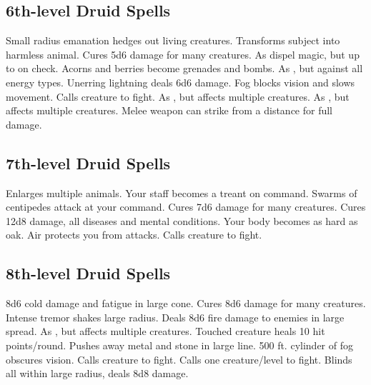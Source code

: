 \subsection{6th-level Druid Spells}
\begin{spelllist}
   Small radius emanation hedges out living creatures.
   Transforms subject into harmless animal.
   Cures 5d6 damage for many creatures.
   As dispel magic, but up to  on check.
   Acorns and berries become grenades and bombs.
   As , but against all energy types.
   Unerring lightning deals 6d6 damage.
   Fog blocks vision and slows movement.
   Calls creature to fight.
   As , but affects multiple creatures.
   As , but affects multiple creatures.
   Melee weapon can strike from a distance for full damage.
\end{spelllist}

\subsection{7th-level Druid Spells}
\begin{spelllist}
   Enlarges multiple animals.
   Your staff becomes a treant on command.
   Swarms of centipedes attack at your command.
   Cures 7d6 damage for many creatures.
   Cures 12d8 damage, all diseases and mental conditions.
   Your body becomes as hard as oak. 
   Air protects you from attacks. 
   Calls creature to fight.
\end{spelllist}

\subsection{8th-level Druid Spells}
\begin{spelllist}
   8d6 cold damage and fatigue in large cone.
   Cures 8d6 damage for many creatures.
   Intense tremor shakes large radius.
   Deals 8d6 fire damage to enemies in large spread.
   As , but affects multiple creatures.
   Touched creature heals 10 hit points/round.
   Pushes away metal and stone in large line.
   500 ft. cylinder of fog obscures vision.
   Calls creature to fight.
   Calls one creature/level to fight.
   Blinds all within large radius, deals 8d8 damage.
\end{spelllist}

